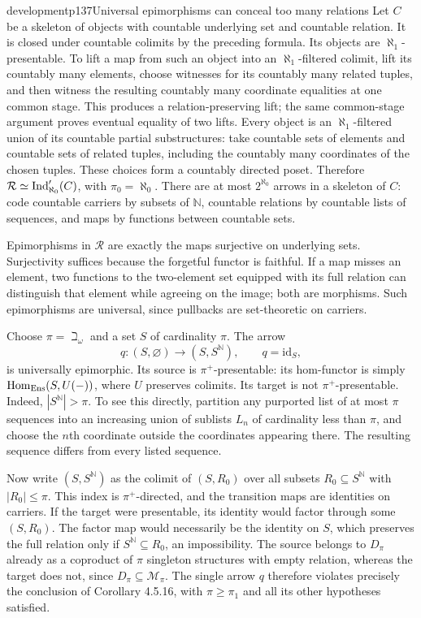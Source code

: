 \begin{dcomment}{development}{p137}{Universal epimorphisms can conceal too many relations}
Let $C$ be a skeleton of objects with countable underlying set and countable relation. It is closed under countable colimits by the preceding formula. Its objects are $\aleph_1$-presentable. To lift a map from such an object into an $\aleph_1$-filtered colimit, lift its countably many elements, choose witnesses for its countably many related tuples, and then witness the resulting countably many coordinate equalities at one common stage. This produces a relation-preserving lift; the same common-stage argument proves eventual equality of two lifts. Every object is an $\aleph_1$-filtered union of its countable partial substructures: take countable sets of elements and countable sets of related tuples, including the countably many coordinates of the chosen tuples. These choices form a countably directed poset. Therefore $\mathcal R\simeq\operatorname{Ind}'_{\aleph_0}(C)$, with $\pi_0=\aleph_0$. There are at most $2^{\aleph_0}$ arrows in a skeleton of $C$: code countable carriers by subsets of $\mathbb N$, countable relations by countable lists of sequences, and maps by functions between countable sets.

Epimorphisms in $\mathcal R$ are exactly the maps surjective on underlying sets. Surjectivity suffices because the forgetful functor is faithful. If a map misses an element, two functions to the two-element set equipped with its full relation can distinguish that element while agreeing on the image; both are morphisms. Such epimorphisms are universal, since pullbacks are set-theoretic on carriers.

Choose $\pi=\beth_\omega$ and a set $S$ of cardinality $\pi$. The arrow
\[
 q:(S,\varnothing)\longrightarrow(S,S^{\mathbb N}),
 \qquad q=\mathrm{id}_S,
\]
is universally epimorphic. Its source is $\pi^+$-presentable: its hom-functor is simply $\mathrm{Hom}_{\mathrm{Ens}}(S,U(-))$, where $U$ preserves colimits. Its target is not $\pi^+$-presentable. Indeed, $|S^{\mathbb N}|>\pi$. To see this directly, partition any purported list of at most $\pi$ sequences into an increasing union of sublists $L_n$ of cardinality less than $\pi$, and choose the $n$th coordinate outside the coordinates appearing there. The resulting sequence differs from every listed sequence.

Now write $(S,S^{\mathbb N})$ as the colimit of $(S,R_0)$ over all subsets $R_0\subseteq S^{\mathbb N}$ with $|R_0|\leq\pi$. This index is $\pi^+$-directed, and the transition maps are identities on carriers. If the target were presentable, its identity would factor through some $(S,R_0)$. The factor map would necessarily be the identity on $S$, which preserves the full relation only if $S^{\mathbb N}\subseteq R_0$, an impossibility. The source belongs to $D_\pi$ already as a coproduct of $\pi$ singleton structures with empty relation, whereas the target does not, since $D_\pi\subseteq\mathcal M_\pi$. The single arrow $q$ therefore violates precisely the conclusion of Corollary 4.5.16, with $\pi\geq\pi_1$ and all its other hypotheses satisfied.


\end{dcomment}
